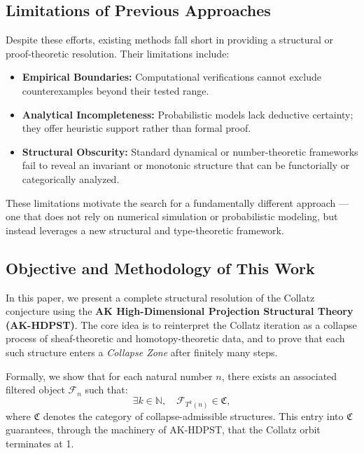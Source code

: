 \documentclass[11pt]{article}
\begin{document}
\subsection{Limitations of Previous Approaches}

Despite these efforts, existing methods fall short in providing a structural or proof-theoretic resolution. Their limitations include:

\begin{itemize}
  \item \textbf{Empirical Boundaries:} Computational verifications cannot exclude counterexamples beyond their tested range.
  
  \item \textbf{Analytical Incompleteness:} Probabilistic models lack deductive certainty; they offer heuristic support rather than formal proof.
  
  \item \textbf{Structural Obscurity:} Standard dynamical or number-theoretic frameworks fail to reveal an invariant or monotonic structure that can be functorially or categorically analyzed.
\end{itemize}

These limitations motivate the search for a fundamentally different approach — one that does not rely on numerical simulation or probabilistic modeling, but instead leverages a new structural and type-theoretic framework.

\subsection{Objective and Methodology of This Work}

In this paper, we present a complete structural resolution of the Collatz conjecture using the \textbf{AK High-Dimensional Projection Structural Theory (AK-HDPST)}. The core idea is to reinterpret the Collatz iteration as a collapse process of sheaf-theoretic and homotopy-theoretic data, and to prove that each such structure enters a \emph{Collapse Zone} after finitely many steps.

Formally, we show that for each natural number \( n \), there exists an associated filtered object \( \mathcal{F}_n \) such that:
\[
\exists k \in \mathbb{N}, \quad \mathcal{F}_{T^k(n)} \in \mathfrak{C},
\]
where \( \mathfrak{C} \) denotes the category of collapse-admissible structures. This entry into \( \mathfrak{C} \) guarantees, through the machinery of AK-HDPST, that the Collatz orbit terminates at 1. 
\end{document}
